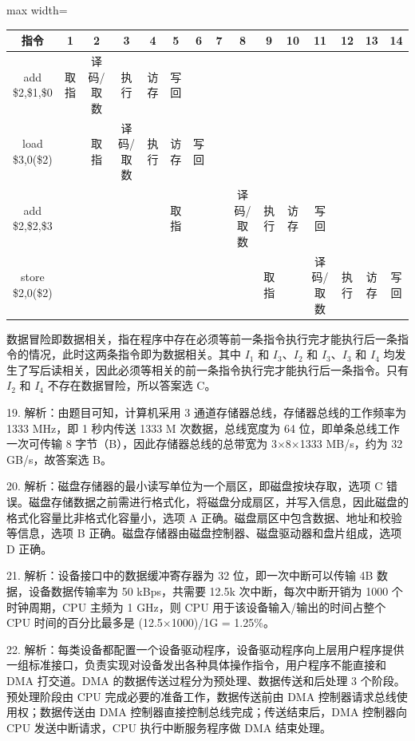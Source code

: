 \documentclass[UTF8,11pt]{ctexart}
\begin{document}
\begin{center}\begin{adjustbox}{max width=\linewidth}\begin{tabular}{|c|c|c|c|c|c|c|c|c|c|c|c|c|c|c|}\hline
指令 & 1 & 2 & 3 & 4 & 5 & 6 & 7 & 8 & 9 & 10 & 11 & 12 & 13 & 14\\\hline
add \$2,\$1,\$0 & 取指 & 译码/取数 & 执行 & 访存 & 写回 &  &  &  &  &  &  &  &  & \\\hline
load \$3,0(\$2) &  & 取指 & 译码/取数 & 执行 & 访存 & 写回 &  &  &  &  &  &  &  & \\\hline
add \$2,\$2,\$3 &  &  &  &  & 取指 &  &  & 译码/取数 & 执行 & 访存 & 写回 &  &  & \\\hline
store \$2,0(\$2) &  &  &  &  &  &  &  &  & 取指 &  & 译码/取数 & 执行 & 访存 & 写回\\\hline\end{tabular}\end{adjustbox}\end{center}

数据冒险即数据相关，指在程序中存在必须等前一条指令执行完才能执行后一条指令的情况，此时这两条指令即为数据相关。其中 \(\displaystyle I_1\) 和 \(\displaystyle I_3\)、\(\displaystyle I_2\) 和 \(\displaystyle I_3\)、\(\displaystyle I_3\) 和 \(\displaystyle I_4\) 均发生了写后读相关，因此必须等相关的前一条指令执行完才能执行后一条指令。只有 \(\displaystyle I_2\) 和 \(\displaystyle I_4\) 不存在数据冒险，所以答案选 C。


19. 解析：由题目可知，计算机采用 3 通道存储器总线，存储器总线的工作频率为 1333 MHz，即 1 秒内传送 1333 M 次数据，总线宽度为 64 位，即单条总线工作一次可传输 8 字节（B），因此存储器总线的总带宽为 3\(\displaystyle \times\)8\(\displaystyle \times\)1333 MB/s，约为 32 GB/s，故答案选 B。


20. 解析：磁盘存储器的最小读写单位为一个扇区，即磁盘按块存取，选项 C 错误。磁盘存储数据之前需进行格式化，将磁盘分成扇区，并写入信息，因此磁盘的格式化容量比非格式化容量小，选项 A 正确。磁盘扇区中包含数据、地址和校验等信息，选项 B 正确。磁盘存储器由磁盘控制器、磁盘驱动器和盘片组成，选项 D 正确。


21. 解析：设备接口中的数据缓冲寄存器为 32 位，即一次中断可以传输 4B 数据，设备数据传输率为 50 kBps，共需要 12.5k 次中断，每次中断开销为 1000 个时钟周期，CPU 主频为 1 GHz，则 CPU 用于该设备输入/输出的时间占整个 CPU 时间的百分比最多是 (12.5\(\displaystyle \times\)1000)/1G = 1.25\%。


22. 解析：每类设备都配置一个设备驱动程序，设备驱动程序向上层用户程序提供一组标准接口，负责实现对设备发出各种具体操作指令，用户程序不能直接和 DMA 打交道。DMA 的数据传送过程分为预处理、数据传送和后处理 3 个阶段。预处理阶段由 CPU 完成必要的准备工作，数据传送前由 DMA 控制器请求总线使用权；数据传送由 DMA 控制器直接控制总线完成；传送结束后，DMA 控制器向 CPU 发送中断请求，CPU 执行中断服务程序做 DMA 结束处理。
\end{document}
